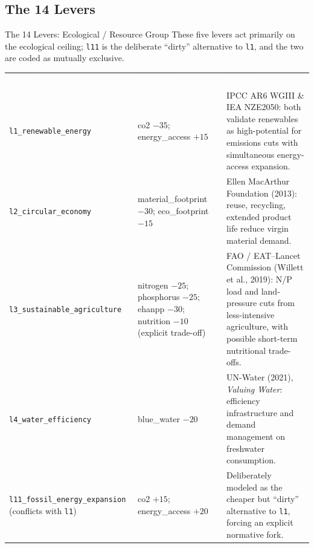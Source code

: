 \documentclass[11pt,aspectratio=169]{beamer}
\newcommand{\tblhead}[1]{\textcolor{white}{\textbf{#1}}}
\begin{document}
\subsection{The 14 Levers}
\begin{frame}{The 14 Levers: Ecological / Resource Group}
  \scriptsize
  These five levers act primarily on the \alert{ecological ceiling}; \texttt{l11} is the deliberate ``dirty'' alternative to \texttt{l1}, and the two are coded as mutually exclusive.
  \renewcommand{\arraystretch}{0.92}
  \begin{tabular}{@{}p{3.1cm}p{3.6cm}p{5cm}@{}}
    \rowcolor{doughnutblue} \tblhead{Lever} & \tblhead{Effect ($\Delta$)} & \tblhead{Source} \\
    \texttt{l1\_renewable\_\allowbreak energy} & co2 $-35$; energy\_access $+15$ &
      IPCC AR6 WGIII \& IEA NZE2050: both validate renewables as high-potential for emissions cuts with simultaneous energy-access expansion. \\
    \texttt{l2\_circular\_\allowbreak economy} & material\_footprint $-30$; eco\_footprint $-15$ &
      Ellen MacArthur Foundation (2013): reuse, recycling, extended product life reduce virgin material demand. \\
    \texttt{l3\_sustainable\_\allowbreak agriculture} & nitrogen $-25$; phosphorus $-25$; ehanpp $-30$; nutrition $-10$ (explicit trade-off) &
      FAO / EAT--Lancet Commission (Willett et al., 2019): N/P load and land-pressure cuts from less-intensive agriculture, with possible short-term nutritional trade-offs. \\
    \texttt{l4\_water\_\allowbreak efficiency} & blue\_water $-20$ &
      UN-Water (2021), \emph{Valuing Water}: efficiency infrastructure and demand management on freshwater consumption. \\
    \texttt{l11\_fossil\_energy\_\allowbreak expansion} (conflicts with \texttt{l1}) & co2 $+15$; energy\_access $+20$ &
      Deliberately modeled as the cheaper but ``dirty'' alternative to \texttt{l1}, forcing an explicit normative fork. \\
  \end{tabular}
\end{frame}
\end{document}
